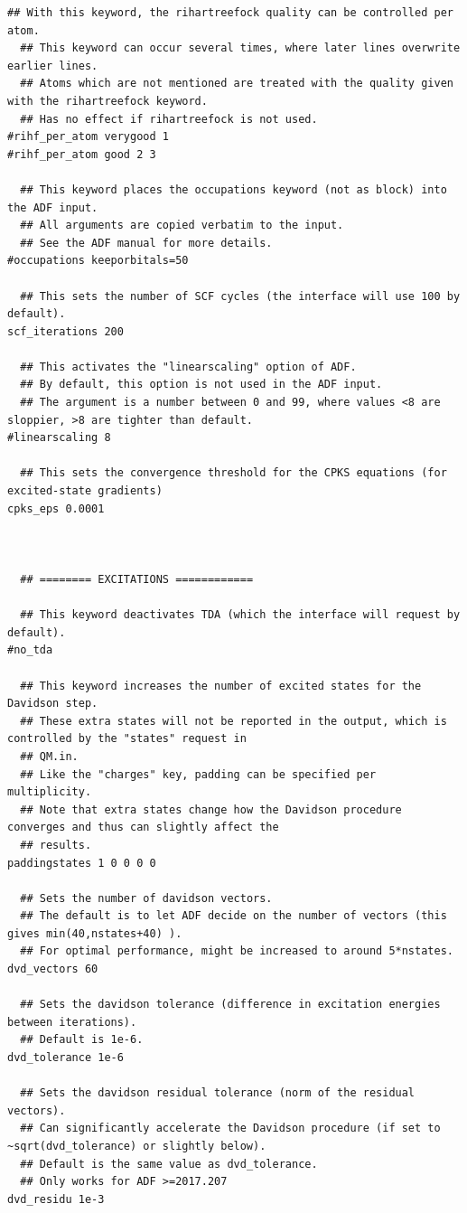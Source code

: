 \documentclass[a4paper,11pt,DIV=15,openany]{scrbook}
\begin{document}
\begin{oframed}
\begin{Verbatim}[commandchars=\\\{\}]
  ## With this keyword, the rihartreefock quality can be controlled per atom.
  ## This keyword can occur several times, where later lines overwrite earlier lines.
  ## Atoms which are not mentioned are treated with the quality given with the rihartreefock keyword.
  ## Has no effect if rihartreefock is not used.
#rihf_per_atom verygood 1
#rihf_per_atom good 2 3

  ## This keyword places the occupations keyword (not as block) into the ADF input.
  ## All arguments are copied verbatim to the input.
  ## See the ADF manual for more details.
#occupations keeporbitals=50

  ## This sets the number of SCF cycles (the interface will use 100 by default).
scf_iterations 200

  ## This activates the "linearscaling" option of ADF.
  ## By default, this option is not used in the ADF input.
  ## The argument is a number between 0 and 99, where values <8 are sloppier, >8 are tighter than default.
#linearscaling 8

  ## This sets the convergence threshold for the CPKS equations (for excited-state gradients)
cpks_eps 0.0001



  ## ======== EXCITATIONS ============

  ## This keyword deactivates TDA (which the interface will request by default).
#no_tda

  ## This keyword increases the number of excited states for the Davidson step.
  ## These extra states will not be reported in the output, which is controlled by the "states" request in 
  ## QM.in.
  ## Like the "charges" key, padding can be specified per multiplicity.
  ## Note that extra states change how the Davidson procedure converges and thus can slightly affect the 
  ## results.
paddingstates 1 0 0 0 0

  ## Sets the number of davidson vectors.
  ## The default is to let ADF decide on the number of vectors (this gives min(40,nstates+40) ).
  ## For optimal performance, might be increased to around 5*nstates.
dvd_vectors 60

  ## Sets the davidson tolerance (difference in excitation energies between iterations).
  ## Default is 1e-6.
dvd_tolerance 1e-6

  ## Sets the davidson residual tolerance (norm of the residual vectors).
  ## Can significantly accelerate the Davidson procedure (if set to ~sqrt(dvd_tolerance) or slightly below).
  ## Default is the same value as dvd_tolerance.
  ## Only works for ADF >=2017.207
dvd_residu 1e-3


\end{Verbatim}
\end{oframed}
\end{document}
